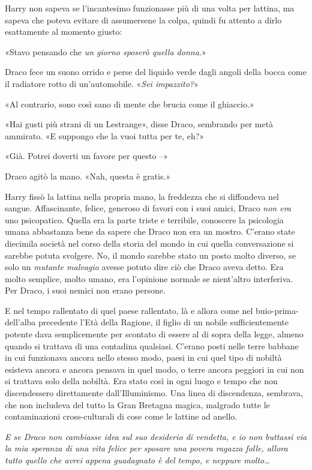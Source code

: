 Harry non sapeva se l’incantesimo funzionasse più di una volta per lattina, ma sapeva che poteva evitare di assumersene la colpa, quindi fu attento a dirlo esattamente al momento giusto:

«Stavo pensando che \textit{un giorno sposerò quella donna.}»

Draco fece un suono orrido e perse del liquido verde dagli angoli della bocca come il radiatore rotto di un’automobile. «\textit{Sei impazzito?}»

«Al contrario, sono così sano di mente che brucia come il ghiaccio.»

«Hai gusti più strani di un Lestrange», disse Draco, sembrando per metà ammirato. «E suppongo che la vuoi tutta per te, eh?»

«Già. Potrei doverti un favore per questo –»

Draco agitò la mano. «Nah, questa è gratis.»

Harry fissò la lattina nella propria mano, la freddezza che si diffondeva nel sangue. Affascinante, felice, generoso di favori con i suoi amici, Draco \textit{non era} uno psicopatico. Quella era la parte triste e terribile, conoscere la psicologia umana abbastanza bene da sapere che Draco non era un mostro. C’erano state diecimila società nel corso della storia del mondo in cui quella conversazione si sarebbe potuta svolgere. No, il mondo sarebbe stato un posto molto diverso, se solo un \textit{mutante malvagio} avesse potuto dire ciò che Draco aveva detto. Era molto semplice, molto umano, era l’opinione normale se nient’altro interferiva. Per Draco, i suoi nemici non erano persone.

E nel tempo rallentato di quel paese rallentato, là e allora come nel buio-prima-dell’alba precedente l’Età della Ragione, il figlio di un nobile sufficientemente potente dava semplicemente per scontato di essere al di sopra della legge, almeno quando si trattava di una contadina qualsiasi. C’erano posti nelle terre babbane in cui funzionava ancora nello stesso modo, paesi in cui quel tipo di nobiltà esisteva ancora e ancora pensava in quel modo, o terre ancora peggiori in cui non si trattava solo della nobiltà. Era stato così in ogni luogo e tempo che non discendessero direttamente dall’Illuminismo. Una linea di discendenza, sembrava, che non includeva del tutto la Gran Bretagna magica, malgrado tutte le contaminazioni cross-culturali di cose come le lattine ad anello.

\textit{E se Draco non cambiasse idea sul suo desiderio di vendetta, e io non buttassi via la mia speranza di una vita felice per sposare una povera ragazza folle, allora tutto quello che avrei appena guadagnato è del tempo, e neppure molto…}

